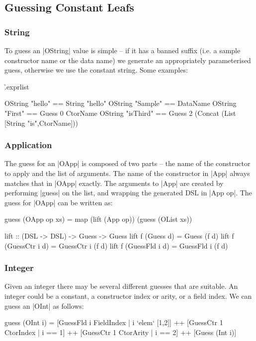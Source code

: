 \documentclass[preprint,draft]{sigplanconf}
\begin{document}
\subsection{Guessing Constant Leafs}

\subsubsection{String}

To guess an |OString| value is simple -- if it has a banned suffix (i.e. a sample constructor name or the data name) we generate an appropriately parameterised guess, otherwise we use the constant string. Some examples:

\h{.exprlist}\begin{code}
OString "hello" == String "hello"
OString "Sample" == DataName
OString "First" == Guess 0 CtorName
OString "isThird" == Guess 2
    (Concat (List [String "is",CtorName]))
\end{code}

\subsubsection{Application}

The guess for an |OApp| is composed of two parts -- the name of the constructor to apply and the list of arguments. The name of the constructor in |App| always matches that in |OApp| exactly. The arguments to |App| are created by performing |guess| on the list, and wrapping the generated DSL in |App op|. The guess for |OApp| can be written as:

\begin{code}
guess (OApp op xs) = map (lift (App op)) (guess (OList xs))

lift :: (DSL -> DSL) -> Guess -> Guess
lift f (Guess       d) = Guess       (f d)
lift f (GuessCtr i  d) = GuessCtr i  (f d)
lift f (GuessFld i  d) = GuessFld i  (f d)
\end{code}

\subsubsection{Integer}

Given an integer there may be several different guesses that are suitable. An integer could be a constant, a constructor index or arity, or a field index. We can guess an |OInt| as follows:

\begin{code}
guess (OInt i) =
    [GuessFld i FieldIndex | i `elem` [1,2]] ++
    [GuessCtr 1 CtorIndex | i == 1] ++
    [GuessCtr 1 CtorArity | i == 2] ++
    [Guess (Int i)]
\end{code}
\end{document}
